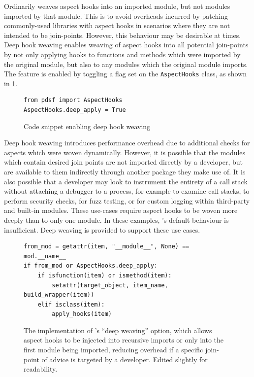 Ordinarily \pdsfthree weaves aspect hooks into an imported module, but not modules
imported by that module. This is to avoid overheads incurred by patching
commonly-used libraries with aspect hooks in scenarios where they are not
intended to be join-points. However, this behaviour may be desirable at times.
Deep hook weaving enables weaving of aspect hooks into all potential join-points
by not only applying hooks to functions and methods which were imported by the
original module, but also to any modules which the original module imports. The
feature is enabled by toggling a flag set on the \lstinline{AspectHooks} class,
as shown in \cref{fig:enabling_deep_apply}.

\begin{figure}[h]
    \begin{lstlisting}[style=footnotesize_python]
from pdsf import AspectHooks
AspectHooks.deep_apply = True
    \end{lstlisting}
    \caption{Code snippet enabling deep hook weaving}
    \label{fig:enabling_deep_apply}
\end{figure}

Deep hook weaving introduces performance overhead due to additional checks for
aspects which were woven dynamically. However, it is possible that the modules
which contain desired join points are not imported directly by a developer, but
are available to them indirectly through another package they make use of. It is
also possible that a developer may look to instrument the entirety of a call
stack without attaching a debugger to a process, for example to examine call
stacks, to perform security checks, for fuzz testing, or for custom logging
within third-party and built-in modules. These use-cases require aspect hooks to
be woven more deeply than to only one module. In these examples, \pdsfthree{}'s
default behaviour is insufficient. Deep weaving is provided to support these use
cases.

\begin{figure}
    \begin{lstlisting}[style=footnotesize_python]
from_mod = getattr(item, "__module__", None) == mod.__name__
if from_mod or AspectHooks.deep_apply:
    if isfunction(item) or ismethod(item):
        setattr(target_object, item_name, build_wrapper(item))
    elif isclass(item):
        apply_hooks(item)
    \end{lstlisting}
    \caption{The implementation of \pdsfthree{}'s ``deep weaving'' option, which
    allows aspect hooks to be injected into recursive imports or only into the
    first module being imported, reducing overhead if a specific join-point of
    advice is targeted by a developer. Edited slightly for readability.}
    \label{fig:deep_weaving_optimisation_implementation}
\end{figure}

